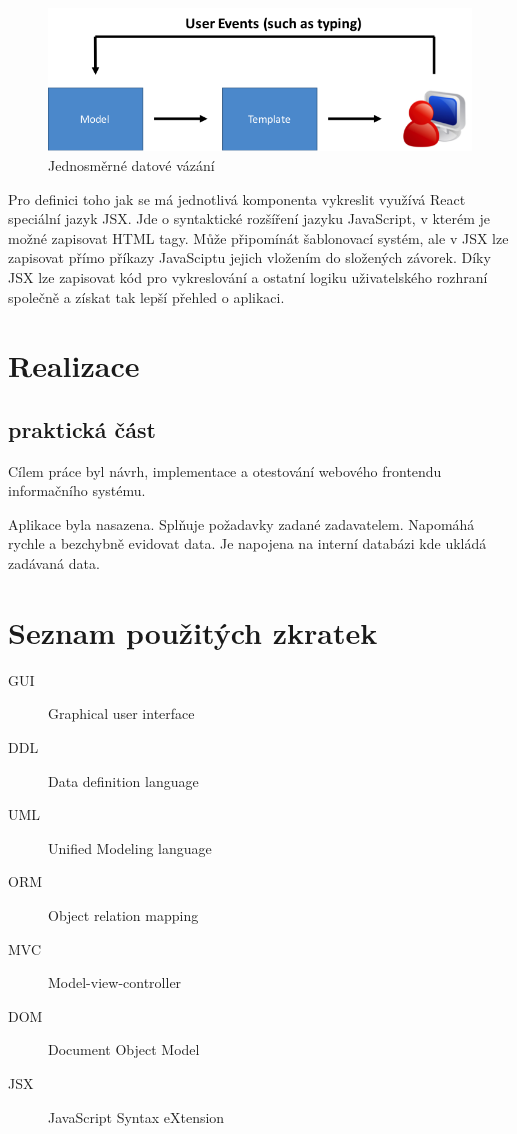 \documentclass[thesis=B,czech]{FITthesis}[2012/06/26]
\begin{document}
\begin{figure}
	\includegraphics[width=\textwidth]{databinding2.png}
	\caption{Jednosměrné datové vázání}\label{data_binding}
\end{figure}
	
	Pro definici toho jak se má jednotlivá komponenta vykreslit využívá React speciální jazyk JSX. Jde o syntaktické rozšíření jazyku JavaScript, v kterém je možné zapisovat HTML tagy. Může připomínát šablonovací systém, ale v JSX lze zapisovat přímo příkazy JavaSciptu jejich vložením do složených závorek. Díky JSX lze zapisovat kód pro vykreslování a ostatní logiku uživatelského rozhraní společně a získat tak lepší přehled o aplikaci.\cite{jsx} 
	

\chapter{Realizace}

\section{praktická část}

\begin{conclusion}
	Cílem práce byl návrh, implementace a otestování webového frontendu informačního systému.
	
	Aplikace byla nasazena. Splňuje požadavky zadané zadavatelem. Napomáhá rychle a bezchybně evidovat data. Je napojena na interní databázi kde ukládá zadávaná data.
\end{conclusion}




\appendix

\chapter{Seznam použitých zkratek}
\begin{description}
	\item[GUI] Graphical user interface
	\item[DDL] Data definition language
	\item[UML] Unified Modeling language
	\item[ORM] Object relation mapping
	\item[MVC] Model-view-controller
	\item[DOM] Document Object Model
	\item[JSX] JavaScript Syntax eXtension
\end{description}
\end{document}
